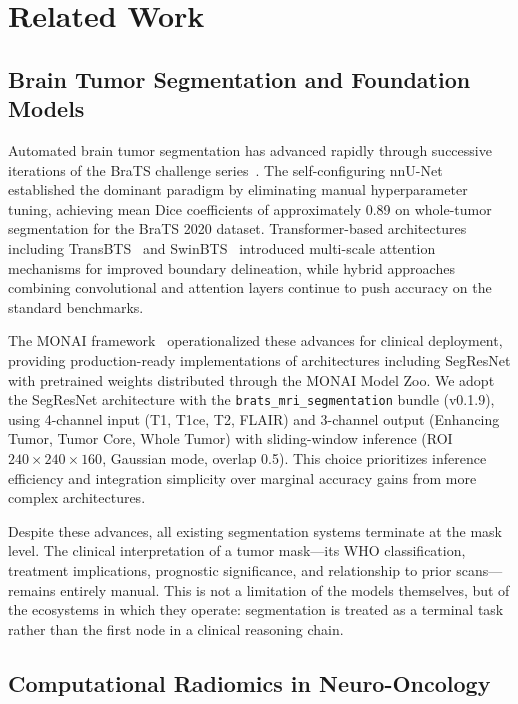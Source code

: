 \section{Related Work}

\subsection{Brain Tumor Segmentation and Foundation Models}

Automated brain tumor segmentation has advanced rapidly through successive iterations of the BraTS challenge series~\cite{menze2015brats, bakas2018brats}. The self-configuring nnU-Net~\cite{isensee2021nnu} established the dominant paradigm by eliminating manual hyperparameter tuning, achieving mean Dice coefficients of approximately 0.89 on whole-tumor segmentation for the BraTS 2020 dataset. Transformer-based architectures including TransBTS~\cite{wang2021transbts} and SwinBTS~\cite{jiang2022swinbts} introduced multi-scale attention mechanisms for improved boundary delineation, while hybrid approaches combining convolutional and attention layers continue to push accuracy on the standard benchmarks.

The MONAI framework~\cite{monai2023} operationalized these advances for clinical deployment, providing production-ready implementations of architectures including SegResNet with pretrained weights distributed through the MONAI Model Zoo. We adopt the SegResNet architecture with the \texttt{brats\_mri\_segmentation} bundle (v0.1.9), using 4-channel input (T1, T1ce, T2, FLAIR) and 3-channel output (Enhancing Tumor, Tumor Core, Whole Tumor) with sliding-window inference (ROI $240 \times 240 \times 160$, Gaussian mode, overlap 0.5). This choice prioritizes inference efficiency and integration simplicity over marginal accuracy gains from more complex architectures.

Despite these advances, all existing segmentation systems terminate at the mask level. The clinical interpretation of a tumor mask---its WHO classification, treatment implications, prognostic significance, and relationship to prior scans---remains entirely manual. This is not a limitation of the models themselves, but of the ecosystems in which they operate: segmentation is treated as a terminal task rather than the first node in a clinical reasoning chain.

\subsection{Computational Radiomics in Neuro-Oncology}


